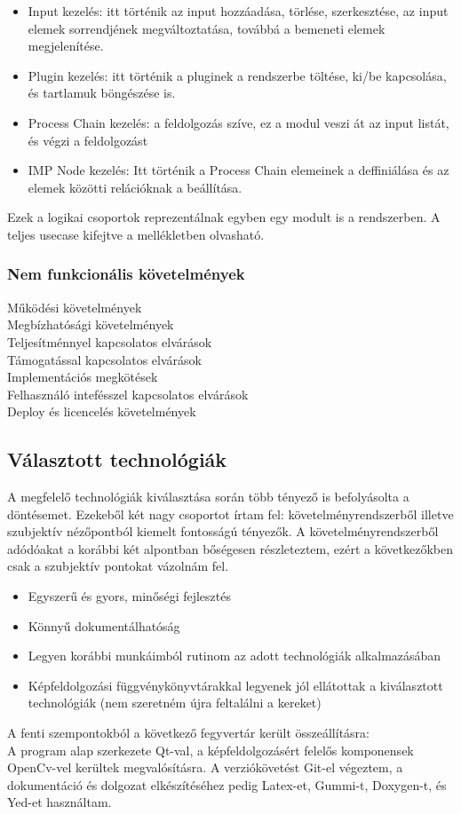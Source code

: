 \documentclass[a4paper,12pt,oneside]{report}
\begin{document}
\begin{itemize}
	\itemsep0em
	\item Input kezelés: itt történik az input hozzáadása, törlése, szerkesztése, az input elemek sorrendjének megváltoztatása, továbbá a bemeneti elemek megjelenítése.

	\item Plugin kezelés: itt történik a pluginek a rendszerbe töltése, ki/be kapcsolása, és tartlamuk böngészése is.
	\item Process Chain kezelés: a feldolgozás szíve, ez a modul veszi át az input listát, és végzi a feldolgozást
	\item IMP Node kezelés: Itt történik a Process Chain elemeinek a deffiniálása és az elemek közötti relációknak a beállítása.
\end{itemize}

Ezek a logikai csoportok reprezentálnak egyben egy modult is a rendszerben.
A teljes usecase kifejtve a mellékletben olvasható.

\subsubsection{Nem funkcionális követelmények}
Működési követelmények\\
Megbízhatósági követelmények\\
Teljesítménnyel kapcsolatos elvárások\\
Támogatással kapcsolatos elvárások \\
Implementációs megkötések\\
Felhasználó intefésszel kapcsolatos elvárások\\
Deploy és licencelés követelmények

\subsection{Választott technológiák}
A megfelelő technológiák kiválasztása során több tényező is befolyásolta a döntésemet. Ezekeből két nagy csoportot írtam fel: követelményrendszerből illetve szubjektív nézőpontból kiemelt fontosságú tényezők. A követelményrendszerből adódóakat a korábbi két alpontban bőségesen részleteztem, ezért a következőkben csak a szubjektív pontokat vázolnám fel.
\begin{itemize}
	\itemsep0em
	\item Egyszerű és gyors, minőségi fejlesztés
	\item Könnyű dokumentálhatóság
	\item Legyen korábbi munkáimból rutinom az adott technológiák alkalmazásában
	\item Képfeldolgozási függvénykönyvtárakkal legyenek jól ellátottak a kiválasztott technológiák (nem szeretném újra feltalálni a kereket)

\end{itemize}
A fenti szempontokból a következő fegyvertár került összeállításra:\\ A program alap szerkezete Qt-val, a képfeldolgozásért felelős komponensek OpenCv-vel kerültek megvalósításra. A verziókövetést Git-el végeztem, a dokumentáció és dolgozat elkészítéséhez pedig Latex-et, Gummi-t, Doxygen-t, és Yed-et használtam.
\end{document}
